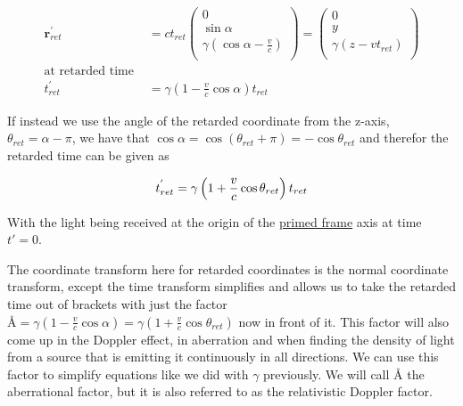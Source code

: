 \begin{equation}
	\begin{aligned}
		\mathbf{r}_{ret}^{'}     & = {c}{{t}_{ret}}
		\begin{pmatrix}
			0                                                \\
			\sin{\alpha}                                     \\
			{\gamma} \left( \cos{\alpha}-\frac{v}{c} \right) \\
		\end{pmatrix}
		=
		\begin{pmatrix}
			0                                             \\
			{y}                                           \\
			{\gamma} \left( {z}-{v} {{{t}_{ret}}} \right) \\
		\end{pmatrix}
		\\
		\text{at retarded time } &
		\\ {{t}_{ret}^{'}} & = {\gamma} \left(1-\frac{v}{c} \cos{\alpha} \right) {{{t}_{ret}}}
	\end{aligned}
\end{equation}

If instead we use the angle of the retarded coordinate from the z-axis, $\theta_{ret} = \alpha - \pi$, we have that $\cos{\alpha}=\cos{(\theta_{ret}+\pi)}=-\cos{\theta_{ret}}$ and therefor the retarded time can be given as

\begin{equation}
	\\ {{t}_{ret}^{'}} = {\gamma} \left(1 + \frac{v}{c} \cos{\theta_{ret}} \right) {{{t}_{ret}}}
\end{equation}

With the light being received at the origin of the \hyperlink{def-Primed-Frame}{primed frame} axis at time ${t{'}} = 0$.

The coordinate transform here for retarded coordinates is the normal coordinate transform, except the time transform simplifies and allows us to take the retarded time out of brackets with just the factor $\text{\AA}={\gamma} \left(1-\frac{v}{c} \cos{\alpha} \right) = {\gamma} \left(1 + \frac{v}{c} \cos{\theta_{ret}} \right)$ now in front of it.
This factor will also come up in the Doppler effect, in aberration and when finding the density of light from a source that is emitting it continuously in all directions.
We can use this factor to simplify equations like we did with $\gamma$ previously.
We will call $\text{\AA}$ the aberrational factor, but it is also referred to as the relativistic Doppler factor.

